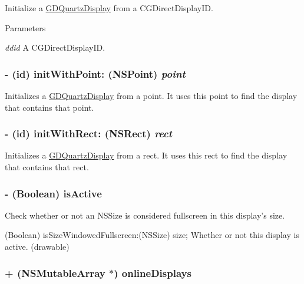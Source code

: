 Initialize a \hyperlink{interface_g_d_quartz_display}{GDQuartzDisplay} from a CGDirectDisplayID. 
\begin{DoxyParams}{Parameters}
\item[{\em ddid}]A CGDirectDisplayID. \end{DoxyParams}
\hypertarget{interface_g_d_quartz_display_ac7ce19beffef302365fa541937a9eb9a}{
\subsubsection[{initWithPoint:}]{\setlength{\rightskip}{0pt plus 5cm}-\/ (id) initWithPoint: (NSPoint) {\em point}}}
\label{interface_g_d_quartz_display_ac7ce19beffef302365fa541937a9eb9a}


Initializes a \hyperlink{interface_g_d_quartz_display}{GDQuartzDisplay} from a point. It uses this point to find the display that contains that point. \hypertarget{interface_g_d_quartz_display_a9bd1f8110df39a9e04cdb50baba92627}{
\subsubsection[{initWithRect:}]{\setlength{\rightskip}{0pt plus 5cm}-\/ (id) initWithRect: (NSRect) {\em rect}}}
\label{interface_g_d_quartz_display_a9bd1f8110df39a9e04cdb50baba92627}


Initializes a \hyperlink{interface_g_d_quartz_display}{GDQuartzDisplay} from a rect. It uses this rect to find the display that contains that rect. \hypertarget{interface_g_d_quartz_display_a39d3da702afebd2da2ede0eb04a62140}{
\subsubsection[{isActive}]{\setlength{\rightskip}{0pt plus 5cm}-\/ (Boolean) isActive }}
\label{interface_g_d_quartz_display_a39d3da702afebd2da2ede0eb04a62140}


Check whether or not an NSSize is considered fullscreen in this display's size. 
\begin{DoxyItemize}
\item (Boolean) isSizeWindowedFullscreen:(NSSize) size; Whether or not this display is active. (drawable) 
\end{DoxyItemize}\hypertarget{interface_g_d_quartz_display_a8ef6d0040c82d777cfaae1f33f4a09fe}{
\subsubsection[{onlineDisplays}]{\setlength{\rightskip}{0pt plus 5cm}+ (NSMutableArray $\ast$) onlineDisplays }}
\label{interface_g_d_quartz_display_a8ef6d0040c82d777cfaae1f33f4a09fe}


